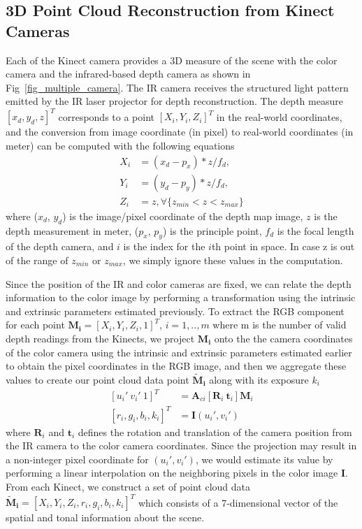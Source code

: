 \subsection{3D Point Cloud Reconstruction from Kinect Cameras}
Each of the Kinect camera provides a 3D measure of the scene with the color camera and the infrared-based depth camera as shown in Fig~\ref{fig_multiple_camera}. The IR camera receives the structured light pattern emitted by the IR laser projector for depth reconstruction. The depth measure $[x_d, y_d, z]^T$ corresponds to a point $[X_i,Y_i,Z_i]^T$ in the real-world coordinates, and the conversion from image coordinate (in pixel) to real-world coordinates (in meter) can be computed with the following equations
\begin{equation}
\begin{split}
X_i &= (x_d - p_x) * z / f_d,\\
Y_i &= (y_d - p_y) * z / f_d, \\
Z_i &= z, \forall \{ z_{min}<z<z_{max}\}
\label{3D_kinect_color}
\end{split}
\end{equation}
where ($x_d$, $y_d$) is the image/pixel coordinate of the depth map image, $z$ is the depth measurement in meter, ($p_x$, $p_y$) is the principle point, $f_d$ is the focal length of the depth camera, and $i$ is the index for the $i$th point in space. In case z is out of the range of $z_{min}$ or $z_{max}$, we simply ignore these values in the computation.

Since the position of the IR and color cameras are fixed, we can relate the depth information to the color image by performing a transformation using the intrinsic and extrinsic parameters estimated previously. To extract the RGB component for each point $\mathbf{M_i} = [X_i, Y_i, Z_i, 1]^T$, $i=1,..,m$ where m is the number of valid depth readings from the Kinects, we project $\mathbf{M_i}$ onto the the camera coordinates of the color camera using the intrinsic and extrinsic parameters estimated earlier to obtain the pixel coordinates in the RGB image, and then we aggregate these values to create our point cloud data point $\mathbf{\tilde{M}_{i}}$ along with its exposure $k_i$ 
\begin{equation}
\begin{split}
[u_i'~v_i'~1]^T &=  \mathbf{A}_{ci}[\mathbf{R}_i~\mathbf{t}_i]\mathbf{M}_i \\
[r_i, g_i, b_i, k_i]^T &= \mathbf{I}(u_i', v_i')
\label{eq_3D_rgb_lookup}
\end{split}
\end{equation}
where $\mathbf{R}_i$ and $\mathbf{t}_i$ defines the rotation and translation of the camera position from the IR camera to the color camera coordinates. Since the projection may result in a non-integer pixel coordinate for $(u_i', v_i')$, we would estimate its value by performing a linear interpolation on the neighboring pixels in the color image $\mathbf{I}$. From each Kinect, we construct a set of point cloud data $\mathbf{\tilde{M}_{i}} = [X_i, Y_i, Z_i, r_i, g_i, b_i, k_i]^T$ which consists of a 7-dimensional vector of the spatial and tonal information about the scene.


